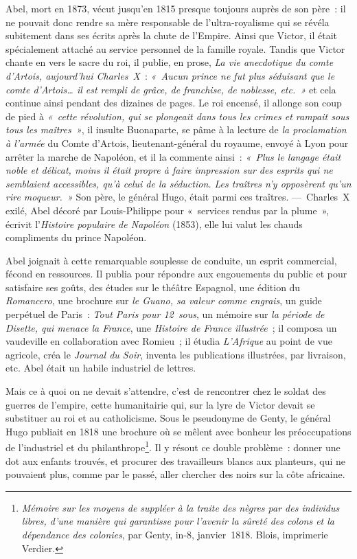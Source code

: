 \documentclass[french,twoside]{book} %
\newcommand{\bibl}[1]{{\RaggedLeft{#1}\par\bigskip}}
\begin{document}
\bibl{\emph{Odes}. Livre II. VIII. Édit. 1823.}
\noindent Abel, mort en 1873, vécut jusqu’en 1815 presque toujours auprès de son père : il ne pouvait donc rendre sa mère responsable de l’ultra-royalisme qui se révéla subitement dans ses écrits après la chute de l’Empire. Ainsi que Victor, il était spécialement attaché au service personnel de la famille royale. Tandis que Victor chante en vers le sacre du roi, il publie, en prose, \emph{La vie anecdotique du comte d’Artois, aujourd’hui Charles X} : \emph{« Aucun prince ne fut plus séduisant que le comte d’Artois… il est rempli de grâce, de franchise, de noblesse,  
\label{p20}etc. »} et cela continue ainsi pendant des dizaines de pages. Le roi encensé, il allonge son coup de pied à \emph{« cette révolution, qui se plongeait dans tous les crimes et rampait sous tous les maîtres »}, il insulte Buonaparte, se pâme à la lecture de {\itshape la proclamation à l’armée} du Comte d’Artois, lieutenant-général du royaume, envoyé à Lyon pour arrêter la marche de Napoléon, et il la commente ainsi : \emph{« Plus le langage était noble et délicat, moins il était propre à faire impression sur des esprits qui ne semblaient accessibles, qu’à celui de la séduction. Les traîtres n’y opposèrent qu’un rire moqueur. »} Son père, le général Hugo, était parmi ces traîtres. — Charles X exilé, Abel décoré par Louis-Philippe pour « services rendus par la plume », écrivit l’\emph{Histoire populaire de Napoléon} (1853), elle lui valut les chauds compliments du prince Napoléon.\par
Abel joignait à cette remarquable souplesse de conduite, un esprit commercial, fécond en ressources. Il publia pour répondre aux engouements du public et pour satisfaire ses goûts, des études sur le théâtre Espagnol, une édition du \emph{Romancero}, une brochure sur \emph{le Guano, sa valeur comme engrais}, un guide perpétuel de Paris : \emph{Tout Paris pour 12 sous}, un mémoire sur \emph{la période de Disette, qui menace la France}, une \emph{Histoire de France illustrée} ; il composa un vaudeville en collaboration avec Romieu ; il étudia \emph{L’Afrique} au point de vue agricole, créa le \emph{Journal du Soir}, inventa les publications illustrées, par livraison, etc. Abel était un habile industriel de lettres.\par
Mais ce à quoi on ne devait s’attendre, c’est de  
\label{p21}rencontrer chez le soldat des guerres de l’empire, cette humanitairie qui, sur la lyre de Victor devait se substituer au roi et au catholicisme. Sous le pseudonyme de Genty, le général Hugo publiait en 1818 une brochure où se mêlent avec bonheur les préoccupations de l’industriel et du philanthrope\footnote{\emph{Mémoire sur les moyens de suppléer à la traite des nègres par des individus libres, d’une manière qui garantisse pour l’avenir la sûreté des colons et la dépendance des colonies}, par Genty, in-8, janvier 1818. Blois, imprimerie Verdier.}. Il y résout ce double problème : donner une dot aux enfants trouvés, et procurer des travailleurs blancs aux planteurs, qui ne pouvaient plus, comme par le passé, aller chercher des noirs sur la côte africaine.\par
\end{document}
